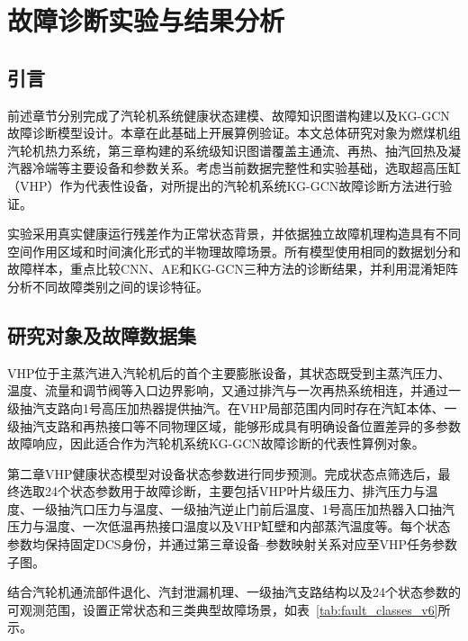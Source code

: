 \section{故障诊断实验与结果分析}
\label{sec:experiments_v6}

\subsection{引言}

前述章节分别完成了汽轮机系统健康状态建模、故障知识图谱构建以及KG-GCN故障诊断模型设计。本章在此基础上开展算例验证。本文总体研究对象为燃煤机组汽轮机热力系统，第三章构建的系统级知识图谱覆盖主通流、再热、抽汽回热及凝汽器冷端等主要设备和参数关系。考虑当前数据完整性和实验基础，选取超高压缸（VHP）作为代表性设备，对所提出的汽轮机系统KG-GCN故障诊断方法进行验证。

实验采用真实健康运行残差作为正常状态背景，并依据独立故障机理构造具有不同空间作用区域和时间演化形式的半物理故障场景。所有模型使用相同的数据划分和故障样本，重点比较CNN、AE和KG-GCN三种方法的诊断结果，并利用混淆矩阵分析不同故障类别之间的误诊特征。

\subsection{研究对象及故障数据集}
\label{subsec:fault_dataset_v6}

VHP位于主蒸汽进入汽轮机后的首个主要膨胀设备，其状态既受到主蒸汽压力、温度、流量和调节阀等入口边界影响，又通过排汽与一次再热系统相连，并通过一级抽汽支路向1号高压加热器提供抽汽。在VHP局部范围内同时存在汽缸本体、一级抽汽支路和再热接口等不同物理区域，能够形成具有明确设备位置差异的多参数故障响应，因此适合作为汽轮机系统KG-GCN故障诊断的代表性算例对象。

第二章VHP健康状态模型对设备状态参数进行同步预测。完成状态点筛选后，最终选取24个状态参数用于故障诊断，主要包括VHP叶片级压力、排汽压力与温度、一级抽汽口压力与温度、一级抽汽逆止门前后温度、1号高压加热器入口抽汽压力与温度、一次低温再热接口温度以及VHP缸壁和内部蒸汽温度等。每个状态参数均保持固定DCS身份，并通过第三章设备--参数映射关系对应至VHP任务参数子图。

结合汽轮机通流部件退化、汽封泄漏机理、一级抽汽支路结构以及24个状态参数的可观测范围，设置正常状态和三类典型故障场景，如表~\ref{tab:fault_classes_v6}所示。

